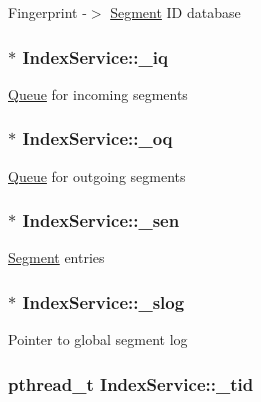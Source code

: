 \-Fingerprint -\/$>$ \hyperlink{structSegment}{\-Segment} \-I\-D database \hypertarget{structIndexService_a181bd6964cfc8697acdceec1479114d3}{
\subsubsection[{\-\_\-iq}]{$\ast$ {\bf \-Index\-Service\-::\-\_\-iq}}}\label{structIndexService_a181bd6964cfc8697acdceec1479114d3}
\hyperlink{structQueue}{\-Queue} for incoming segments \hypertarget{structIndexService_aeff079244075907b6867b69f5f9084e3}{
\subsubsection[{\-\_\-oq}]{$\ast$ {\bf \-Index\-Service\-::\-\_\-oq}}}\label{structIndexService_aeff079244075907b6867b69f5f9084e3}
\hyperlink{structQueue}{\-Queue} for outgoing segments \hypertarget{structIndexService_a08a917690484534f5624b01dc12dcbe7}{
\subsubsection[{\-\_\-sen}]{$\ast$ {\bf \-Index\-Service\-::\-\_\-sen}}}\label{structIndexService_a08a917690484534f5624b01dc12dcbe7}
\hyperlink{structSegment}{\-Segment} entries \hypertarget{structIndexService_a0e09e9c7eb8e8118ae76097df7cb3f01}{
\subsubsection[{\-\_\-slog}]{$\ast$ {\bf \-Index\-Service\-::\-\_\-slog}}}\label{structIndexService_a0e09e9c7eb8e8118ae76097df7cb3f01}
\-Pointer to global segment log \hypertarget{structIndexService_a141d6cafddb2e4b95a4b1f0b23309acd}{
\subsubsection[{\-\_\-tid}]{\setlength{\rightskip}{0pt plus 5cm}pthread\-\_\-t {\bf \-Index\-Service\-::\-\_\-tid}}}\label{structIndexService_a141d6cafddb2e4b95a4b1f0b23309acd}
